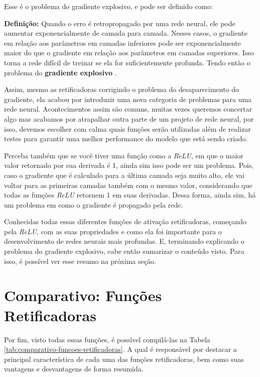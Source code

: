 Esse é o problema do gradiente explosivo, e pode ser definido como:

\begin{definicaomoderna}{\textbf{Definição:}}
    Quando o erro é retropropagado por uma rede neural, ele pode aumentar exponencialmente de camada para camada. Nesses casos, o gradiente em relação aos parâmetros em camadas inferiores pode ser exponencialmente maior do que o gradiente em relação aos parâmetros em camadas superiores. Isso torna a rede difícil de treinar se ela for suficientemente profunda. Tendo então o problema do \textbf{gradiente explosivo} \parencite{ExplodingGradient}.
\end{definicaomoderna}

Assim, mesmo as retificadoras corrigindo o problema do desaparecimento do gradiente, ela acabou por introduzir uma nova categoria de problemas para uma rede neural. Acontecimentos assim são comuns, muitas vezes queremos concertar algo mas acabamos por atrapalhar outra parte de um projeto de rede neural, por isso, devemos escolher com calma quais funções serão utilizadas além de realizar testes para garantir uma melhor performance do modelo que está sendo criado.

Perceba também que se você tiver uma função como a \textit{ReLU}, em que o maior valor retornado por sua derivada é 1, ainda sim isso pode ser um problema. Pois, caso o gradiente que é calculado para a última camada seja muito alto, ele vai voltar para as primeiras camadas também com o mesmo valor, considerando que todas as funções \textit{ReLU} retornem 1 em suas derivadas. Dessa forma, ainda sim, há um problema em como o gradiente é propagado pela rede.

Conhecidas todas essas diferentes funções de ativação retificadoras, começando pela \textit{ReLU}, com as suas propriedades e como ela foi importante para o desenvolvimento de redes neurais mais profundas. E, terminando explicando o problema do gradiente explosivo, cabe então sumarizar o conteúdo visto. Para isso, é possível ver esse resumo na próxima seção.

\section{Comparativo: Funções Retificadoras}

Por fim, visto todas essas funções, é possível compilá-las na Tabela \ref{tab:comparativo-funcoes-retificadoras}. A qual é responsável por destacar a principal característica de cada uma das funções retificadoras, bem como suas vantagens e desvantagens de forma resumida.

